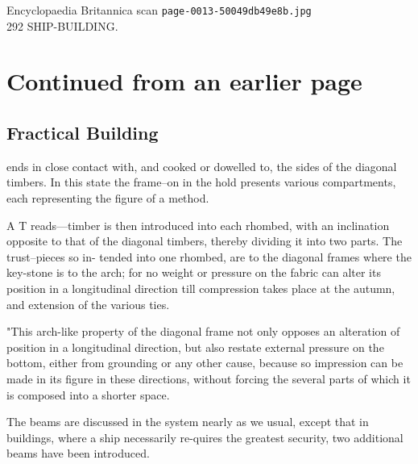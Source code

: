 \documentclass{article}
\begin{document}
\begin{center}
{\Large Encyclopaedia Britannica scan \texttt{page-0013-50049db49e8b.jpg}}\\[0.5em]
292 SHIP-BUILDING.
\end{center}
\section*{Continued from an earlier page}
\subsection*{Fractical Building}
ends in close contact with, and cooked or dowelled to, the sides of the diagonal timbers. In this state the frame--on in the hold presents various compartments, each representing the figure of a method.

A T reads—timber is then introduced into each rhombed, with an inclination opposite to that of the diagonal timbers, thereby dividing it into two parts. The trust--pieces so in- tended into one rhombed, are to the diagonal frames where the key-stone is to the arch; for no weight or pressure on the fabric can alter its position in a longitudinal direction till compression takes place at the autumn, and extension of the various ties.

"This arch-like property of the diagonal frame not only opposes an alteration of position in a longitudinal direction, but also restate external pressure on the bottom, either from grounding or any other cause, because so impression can be made in its figure in these directions, without forcing the several parts of which it is composed into a shorter space.

The beams are discussed in the system nearly as we usual, except that in buildings, where a ship necessarily re-quires the greatest security, two additional beams have been introduced.
\end{document}
